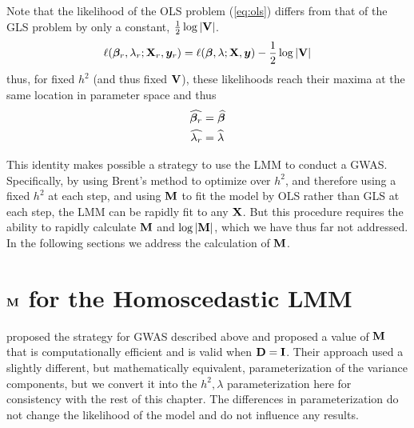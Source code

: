 Note that the likelihood of the OLS problem (\cref{eq:ols}) differs from that of the GLS problem by only a constant, $\frac{1}{2}\log|\mathbf{V}|$.
\begin{align}
  \ell(\boldsymbol{\beta}_r, \lambda_r; \mathbf{X}_r, \bm{y}_r) = \ell(\boldsymbol{\beta}, \lambda; \mathbf{X}, \bm{y}) -\frac{1}{2}\log|\mathbf{V}|
\end{align}
thus, for fixed $h^2$ (and thus fixed $\mathbf{V}$), these likelihoods reach their maxima at the same location in parameter space and thus
\begin{align}
\widehat{\boldsymbol{\beta}_r} &= \widehat{\boldsymbol{\beta}}\\
\widehat{\lambda_r} & = \widehat{\lambda}
\end{align}

This identity makes possible a strategy to use the LMM to conduct a GWAS.
Specifically, by using Brent's method to optimize over $h^2$, and therefore using a fixed $h^2$ at each step, and using $\mathbf{M}$ to fit the model by OLS rather than GLS at each step, the LMM can be rapidly fit to any $\mathbf{X}$.
But this procedure requires the ability to rapidly calculate $\mathbf{M}$ and $\log \left| \mathbf{M} \right|$, which we have thus far not addressed.
In the following sections we address the calculation of $\mathbf{M}$.






\section{\texorpdfstring{$\mathbf{M}$}{M} for the Homoscedastic LMM}

\citet{Kang2008} proposed the strategy for GWAS described above and proposed a value of $\mathbf{M}$ that is computationally efficient and is valid when $\mathbf{D} = \mathbf{I}$.
Their approach used a slightly different, but mathematically equivalent, parameterization of the variance components, but we convert it into the $h^2, \lambda$ parameterization here for consistency with the rest of this chapter.
The differences in parameterization do not change the likelihood of the model and do not influence any results.

